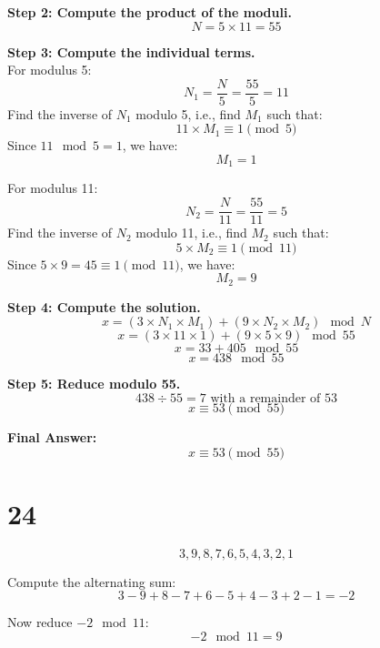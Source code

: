 \documentclass[12pt]{article}
\begin{document}
\textbf{Step 2: Compute the product of the moduli.} \\
\[
N = 5 \times 11 = 55
\]

\textbf{Step 3: Compute the individual terms.} \\
For modulus 5:
\[
N_1 = \frac{N}{5} = \frac{55}{5} = 11
\]
Find the inverse of \( N_1 \) modulo 5, i.e., find \( M_1 \) such that:
\[
11 \times M_1 \equiv 1 \pmod{5}
\]
Since \( 11 \mod 5 = 1 \), we have:
\[
M_1 = 1
\]

For modulus 11:
\[
N_2 = \frac{N}{11} = \frac{55}{11} = 5
\]
Find the inverse of \( N_2 \) modulo 11, i.e., find \( M_2 \) such that:
\[
5 \times M_2 \equiv 1 \pmod{11}
\]
Since \( 5 \times 9 = 45 \equiv 1 \pmod{11} \), we have:
\[
M_2 = 9
\]

\textbf{Step 4: Compute the solution.} \\
\[
x = (3 \times N_1 \times M_1) + (9 \times N_2 \times M_2) \mod N
\]
\[
x = (3 \times 11 \times 1) + (9 \times 5 \times 9) \mod 55
\]
\[
x = 33 + 405 \mod 55
\]
\[
x = 438 \mod 55
\]

\textbf{Step 5: Reduce modulo 55.} \\
\[
438 \div 55 = 7 \text{ with a remainder of } 53
\]
\[
x \equiv 53 \pmod{55}
\]

\textbf{Final Answer:} \\
\[
x \equiv 53 \pmod{55}
\]


\newpage


\section*{24}
\[
3, 9, 8, 7, 6, 5, 4, 3, 2, 1
\]

Compute the alternating sum:
\[
3 - 9 + 8 - 7 + 6 - 5 + 4 - 3 + 2 - 1 = -2
\]

Now reduce \( -2 \mod 11 \):
\[
-2 \mod 11 = 9
\]
\end{document}
